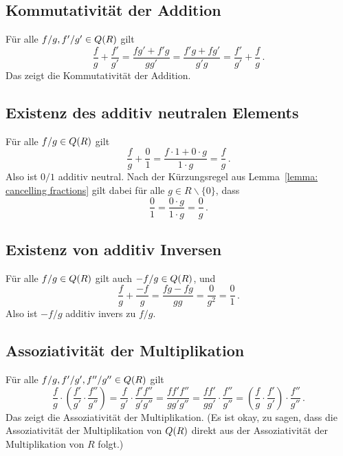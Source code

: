 \subsection*{Kommutativität der Addition}

Für alle $f/g, f'/g' \in Q(R)$ gilt
\[
    \frac{f}{g} + \frac{f'}{g'}
  = \frac{f g' + f' g}{g g'}
  = \frac{f' g + f g'}{g' g}
  = \frac{f'}{g'} + \frac{f}{g} \,.
\]
Das zeigt die Kommutativität der Addition.





\subsection*{Existenz des additiv neutralen Elements}

Für alle $f/g \in Q(R)$ gilt
\[
    \frac{f}{g}
  + \frac{0}{1}
  = \frac{f \cdot 1 + 0 \cdot g}{1 \cdot g}
  = \frac{f}{g} \,.
\]
Also ist $0/1$ additiv neutral.
Nach der Kürzungsregel aus Lemma~\ref{lemma: cancelling fractions} gilt dabei für alle $g \in R \smallsetminus \{0\}$, dass
\[
    \frac{0}{1}
  = \frac{0 \cdot g}{1 \cdot g}
  = \frac{0}{g} \,.
\]





\subsection*{Existenz von additiv Inversen}

Für alle $f/g \in Q(R)$ gilt auch $-f/g \in Q(R)$, und
\[
    \frac{f}{g} + \frac{-f}{g}
  = \frac{f g - f g}{g g}
  = \frac{0}{g^2}
  = \frac{0}{1} \,.
\]
Also ist $-f/g$ additiv invers zu $f/g$.





\subsection*{Assoziativität der Multiplikation}

Für alle $f/g, f'/g', f''/g'' \in Q(R)$ gilt
\[
    \frac{f}{g} \cdot \left( \frac{f'}{g'} \cdot \frac{f''}{g''} \right)
  = \frac{f}{g'} \cdot \frac{f' f''}{g' g''}
  = \frac{f f' f''}{g g' g''}
  = \frac{f f'}{g g'} \cdot \frac{f''}{g''}
  = \left( \frac{f}{g} \cdot \frac{f'}{g'} \right) \cdot \frac{f''}{g''} \,.
\]
Das zeigt die Assoziativität der Multiplikation.
(Es ist okay, zu sagen, dass die Assoziativität der Multiplikation von $Q(R)$ direkt aus der Assoziativität der Multiplikation von $R$ folgt.)





